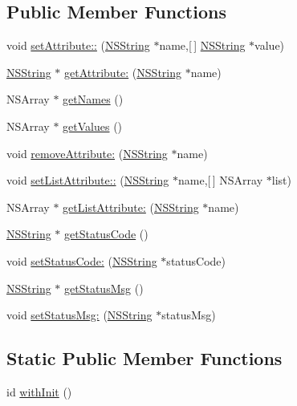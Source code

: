 \subsection*{\-Public \-Member \-Functions}
\begin{DoxyCompactItemize}
\item 
void \hyperlink{interface_response_a9890a2f471885d62a31e6372b81fc37f}{set\-Attribute\-::} (\hyperlink{class_n_s_string}{\-N\-S\-String} $\ast$name,\mbox{[}$\,$\mbox{]} \hyperlink{class_n_s_string}{\-N\-S\-String} $\ast$value)
\item 
\hyperlink{class_n_s_string}{\-N\-S\-String} $\ast$ \hyperlink{interface_response_ae44af1331d621bc51f6357abb1ea2be6}{get\-Attribute\-:} (\hyperlink{class_n_s_string}{\-N\-S\-String} $\ast$name)
\item 
\-N\-S\-Array $\ast$ \hyperlink{interface_response_af3e5d6eea119a75d78e51ebd6a4108d7}{get\-Names} ()
\item 
\-N\-S\-Array $\ast$ \hyperlink{interface_response_ae1a591f26856392400f7f1e54871cc2c}{get\-Values} ()
\item 
void \hyperlink{interface_response_a124952fcaeb24a4bcd64b09f4565676a}{remove\-Attribute\-:} (\hyperlink{class_n_s_string}{\-N\-S\-String} $\ast$name)
\item 
void \hyperlink{interface_response_a6fbc71653294356c5695845659dd07e9}{set\-List\-Attribute\-::} (\hyperlink{class_n_s_string}{\-N\-S\-String} $\ast$name,\mbox{[}$\,$\mbox{]} \-N\-S\-Array $\ast$list)
\item 
\-N\-S\-Array $\ast$ \hyperlink{interface_response_a5e02762120601f571e5dc045ba9b76c3}{get\-List\-Attribute\-:} (\hyperlink{class_n_s_string}{\-N\-S\-String} $\ast$name)
\item 
\hyperlink{class_n_s_string}{\-N\-S\-String} $\ast$ \hyperlink{interface_response_a63c6f112b03ef7f9ef3877e7589e847e}{get\-Status\-Code} ()
\item 
void \hyperlink{interface_response_aab6f0cd88485533738c69e814ba1604f}{set\-Status\-Code\-:} (\hyperlink{class_n_s_string}{\-N\-S\-String} $\ast$status\-Code)
\item 
\hyperlink{class_n_s_string}{\-N\-S\-String} $\ast$ \hyperlink{interface_response_a804fe331490212fdd70e04d3e340282b}{get\-Status\-Msg} ()
\item 
void \hyperlink{interface_response_aec33ce853e7d84ef9996fe86f02fa0da}{set\-Status\-Msg\-:} (\hyperlink{class_n_s_string}{\-N\-S\-String} $\ast$status\-Msg)
\end{DoxyCompactItemize}
\subsection*{\-Static \-Public \-Member \-Functions}
\begin{DoxyCompactItemize}
\item 
id \hyperlink{interface_response_a01cf61daa4f9129750ddee661717884f}{with\-Init} ()
\end{DoxyCompactItemize}


